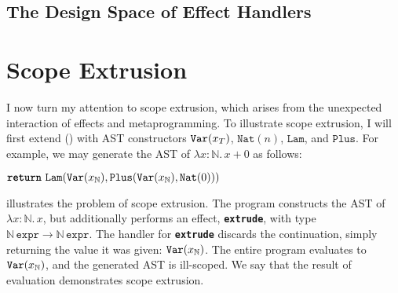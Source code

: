 \subsection{The Design Space of Effect Handlers}\label{subsection:effect-handler-design}

\section{Scope Extrusion}\label{section:scope-extrusion-technical}
I now turn my attention to scope extrusion, which arises from the unexpected interaction of effects and metaprogramming. To illustrate scope extrusion, I will first extend \efflang{} () with AST constructors $\texttt{Var}(x_{T})$, $\texttt{Nat}(n)$, $\texttt{Lam}$, and $\texttt{Plus}$. For example, we may generate the AST of $\lambda x: \mathbb{N}. \, x + 0$ as follows:

\begin{eff}
$\texttt{\textbf{return}} \,\, {\texttt{Lam}(\texttt{Var}(x_{\mathbb{N}}), \texttt{Plus}(\texttt{Var}(x_{\mathbb{N}}), \texttt{Nat}(0)))}$
\end{eff}

 illustrates the problem of scope extrusion. The program constructs the AST of $\lambda x: \mathbb{N}. \, x$, but additionally performs an effect, \textbf{\texttt{extrude}}, with type $\mathbb{N} \,  \texttt{expr} \to \mathbb{N} \, \texttt{expr}$. The handler for \textbf{\texttt{extrude}} discards the continuation, simply returning the value it was given: $\texttt{Var}(x_{\mathbb{N}})$. The entire program evaluates to $\texttt{Var}(x_{\mathbb{N}})$, and the generated AST is ill-scoped. We say that the result of evaluation demonstrates scope extrusion.

